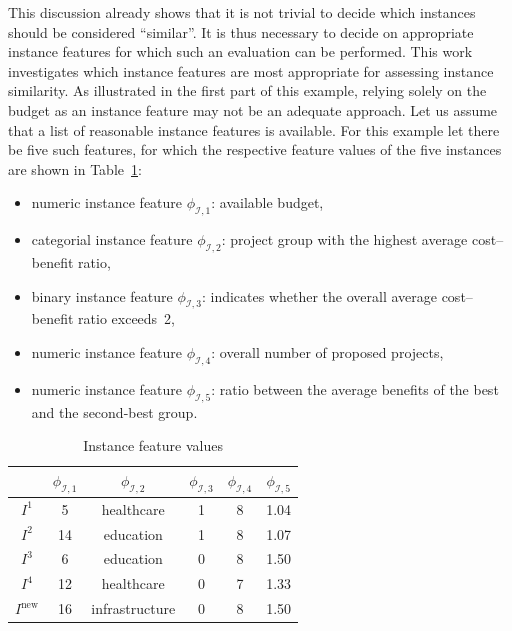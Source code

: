 \documentclass[11pt, a4paper]{article}
\newcommand{\Inew}{I^\text{new}}
\begin{document}
This discussion already shows that it is not trivial to decide which instances should be considered ``similar''. It is thus necessary to decide on appropriate instance features for which such an evaluation can be performed.
This work investigates which instance features are most appropriate for assessing instance similarity. As illustrated in the first part of this example, relying solely on the budget as an instance feature may not be an adequate approach. Let us assume that a list of reasonable instance features is available. For this example let there be five such features, for which the respective feature values of the five instances are shown in Table~\ref{tab-example:instance features}:

\begin{itemize}
	\item numeric instance feature $\phi_{\mathcal{I},1}$: available budget,
	\item categorial instance feature $\phi_{\mathcal{I},2}$: project group with the highest average cost–benefit ratio,
	\item binary instance feature $\phi_{\mathcal{I},3}$: indicates whether the overall average cost–benefit ratio exceeds~2,
	\item numeric instance feature $\phi_{\mathcal{I},4}$: overall number of proposed projects,
	\item numeric instance feature $\phi_{\mathcal{I},5}$: ratio between the average benefits of the best and the second-best group.
\end{itemize}

\begin{table}[htbp]
	\centering
	\caption{Instance feature values\label{tab-example:instance features}}
	\begin{tabular}{c|c|c|c|c|c}
		& $\phi_{\mathcal{I},1}$ & $\phi_{\mathcal{I},2}$ & $\phi_{\mathcal{I},3}$ & $\phi_{\mathcal{I},4}$ & $\phi_{\mathcal{I},5}$ \\
		\hline
		$I^1$ & 5 & healthcare & 1 & 8 & 1.04 \\
		$I^2$ & 14 & education & 1 & 8 & 1.07 \\
		$I^3$ & 6 & education & 0 & 8 & 1.50 \\
		$I^4$ & 12 & healthcare & 0 & 7 & 1.33 \\
		\hline
		$\Inew$ & 16 & infrastructure & 0 & 8 & 1.50
	\end{tabular}
	
\end{table}
\end{document}
